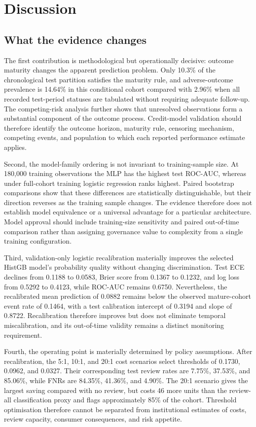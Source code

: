 \documentclass[10pt]{article}
\begin{document}
\section{Discussion}

\subsection{What the evidence changes}

The first contribution is methodological but operationally decisive: outcome maturity changes the apparent prediction problem. Only 10.3\% of the chronological test partition satisfies the maturity rule, and adverse-outcome prevalence is 14.64\% in this conditional cohort compared with 2.96\% when all recorded test-period statuses are tabulated without requiring adequate follow-up. The competing-risk analysis further shows that unresolved observations form a substantial component of the outcome process. Credit-model validation should therefore identify the outcome horizon, maturity rule, censoring mechanism, competing events, and population to which each reported performance estimate applies.

Second, the model-family ordering is not invariant to training-sample size. At 180,000 training observations the MLP has the highest test ROC-AUC, whereas under full-cohort training logistic regression ranks highest. Paired bootstrap comparisons show that these differences are statistically distinguishable, but their direction reverses as the training sample changes. The evidence therefore does not establish model equivalence or a universal advantage for a particular architecture. Model approval should include training-size sensitivity and paired out-of-time comparison rather than assigning governance value to complexity from a single training configuration.

Third, validation-only logistic recalibration materially improves the selected HistGB model's probability quality without changing discrimination. Test ECE declines from 0.1188 to 0.0583, Brier score from 0.1367 to 0.1232, and log loss from 0.5292 to 0.4123, while ROC-AUC remains 0.6750. Nevertheless, the recalibrated mean prediction of 0.0882 remains below the observed mature-cohort event rate of 0.1464, with a test calibration intercept of 0.3194 and slope of 0.8722. Recalibration therefore improves but does not eliminate temporal miscalibration, and its out-of-time validity remains a distinct monitoring requirement.

Fourth, the operating point is materially determined by policy assumptions. After recalibration, the 5:1, 10:1, and 20:1 cost scenarios select thresholds of 0.1730, 0.0962, and 0.0327. Their corresponding test review rates are 7.75\%, 37.53\%, and 85.06\%, while FNRs are 84.35\%, 41.36\%, and 4.90\%. The 20:1 scenario gives the largest saving compared with no review, but costs 46 more units than the review-all classification proxy and flags approximately 85\% of the cohort. Threshold optimisation therefore cannot be separated from institutional estimates of costs, review capacity, consumer consequences, and risk appetite.
\end{document}
